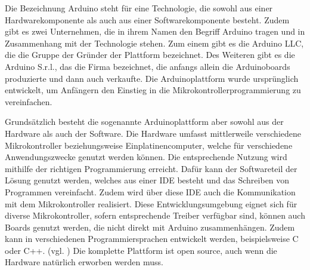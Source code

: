 Die Bezeichnung Arduino steht für eine Technologie, die sowohl aus einer Hardwarekomponente als auch aus einer Softwarekomponente besteht. Zudem gibt es zwei Unternehmen, die in ihrem Namen den Begriff Arduino tragen und in Zusammenhang mit der Technologie stehen. Zum einem gibt es die Arduino LLC, die die Gruppe der Gründer der Plattform bezeichnet. Des Weiteren gibt es die Arduino S.r.l., das die Firma bezeichnet, die anfangs allein die Arduinoboards produzierte und dann auch verkaufte. Die Arduinoplattform wurde ursprünglich entwickelt, um Anfängern den Einstieg in die Mikrokontrollerprogrammierung zu vereinfachen. 

Grundsätzlich besteht die sogenannte Arduinoplattform aber sowohl aus der Hardware als auch der Software. Die Hardware umfasst mittlerweile verschiedene Mikrokontroller beziehungsweise Einplatinencomputer, welche für verschiedene Anwendungszwecke genutzt werden können. Die entsprechende Nutzung wird mithilfe der richtigen Programmierung erreicht. Dafür kann der Softwareteil der Lösung genutzt werden, welches aus einer \ac{IDE}  besteht und das Schreiben von Programmen vereinfacht. Zudem wird über diese \ac{IDE} auch die Kommunikation mit dem Mikrokontroller realisiert. Diese Entwicklungsumgebung eignet sich für diverse Mikrokontroller, sofern entsprechende Treiber verfügbar sind, können auch Boards genutzt werden, die nicht direkt mit Arduino zusammenhängen. Zudem kann in verschiedenen Programmiersprachen entwickelt werden, beispielsweise C oder C++. (vgl. \cite{.h,.f,.e,.i,.g,online.})
Die komplette Plattform ist open source, auch wenn die Hardware natürlich erworben werden muss. 

